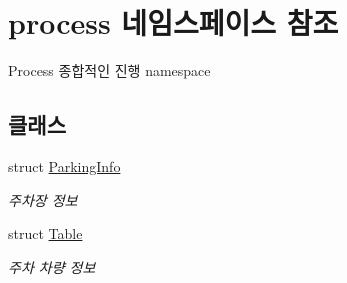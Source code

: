 \hypertarget{namespaceprocess}{}\section{process 네임스페이스 참조}
\label{namespaceprocess}


Process 종합적인 진행 namespace  


\subsection*{클래스}
\begin{DoxyCompactItemize}
\item 
struct \hyperlink{structprocess_1_1_parking_info}{Parking\+Info}
\begin{DoxyCompactList}\small\item\em 주차장 정보 \end{DoxyCompactList}\item 
struct \hyperlink{structprocess_1_1_table}{Table}
\begin{DoxyCompactList}\small\item\em 주차 차량 정보 \end{DoxyCompactList}\end{DoxyCompactItemize}
